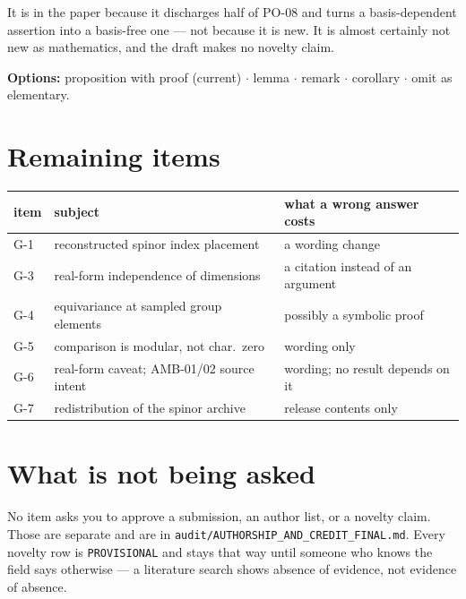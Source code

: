 \documentclass[11pt,a4paper]{article}
\begin{document}
It is in the paper because it discharges half of PO-08 and turns a
basis-dependent assertion into a basis-free one --- not because it is new. It is
almost certainly not new as mathematics, and the draft makes no novelty claim.

\textbf{Options:} proposition with proof (current) $\cdot$ lemma $\cdot$ remark
$\cdot$ corollary $\cdot$ omit as elementary.

\section*{Remaining items}

\begin{center}
\begin{tabular}{lll}
\toprule
item & subject & what a wrong answer costs \\
\midrule
G-1 & reconstructed spinor index placement & a wording change \\
G-3 & real-form independence of dimensions & a citation instead of an argument \\
G-4 & equivariance at sampled group elements & possibly a symbolic proof \\
G-5 & comparison is modular, not char.\ zero & wording only \\
G-6 & real-form caveat; AMB-01/02 source intent & wording; no result depends on it \\
G-7 & redistribution of the spinor archive & release contents only \\
\bottomrule
\end{tabular}
\end{center}

\section*{What is not being asked}

No item asks you to approve a submission, an author list, or a novelty claim.
Those are separate and are in \texttt{audit/AUTHORSHIP\_AND\_CREDIT\_FINAL.md}.
Every novelty row is \texttt{PROVISIONAL} and stays that way until someone who
knows the field says otherwise --- a literature search shows absence of evidence,
not evidence of absence.
\end{document}
